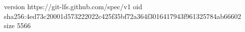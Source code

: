 version https://git-lfs.github.com/spec/v1
oid sha256:4ed73c20001d573222022c425f35bf72a364f3016417943f961325784ab66602
size 5566
